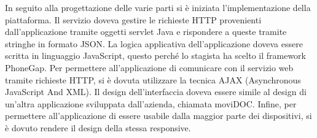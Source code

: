In seguito alla progettazione delle varie parti si è iniziata l'implementazione della piattaforma. Il servizio doveva gestire le richieste HTTP provenienti dall'applicazione tramite oggetti servlet Java e rispondere a queste tramite stringhe in formato JSON.
La logica applicativa dell'applicazione doveva essere scritta in linguaggio JavaScript, questo perché lo stagista ha scelto il framework PhoneGap. Per permettere all'applicazione di comunicare con il servizio web tramite richieste HTTP, si è dovuta utilizzare la tecnica AJAX (Asynchronous JavaScript And XML).
Il design dell'interfaccia doveva essere simile al design di un'altra applicazione sviluppata dall'azienda, chiamata moviDOC. Infine, per permettere all'applicazione di essere usabile dalla maggior parte dei dispositivi, si è dovuto rendere il design della stessa responsive.

%
%

\endgroup			

\vfill

